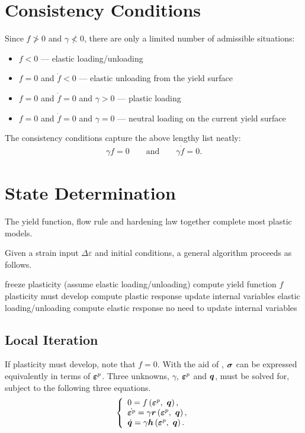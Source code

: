 \section{Consistency Conditions}
Since $f\ngtr0$ and $\gamma\nless0$, there are only a limited number of admissible situations:
\begin{itemize}
\item $f<0$ --- elastic loading/unloading
\item $f=0$ and $\dot{f}<0$ --- elastic unloading from the yield surface
\item $f=0$ and $\dot{f}=0$ and $\gamma>0$ --- plastic loading
\item $f=0$ and $\dot{f}=0$ and $\gamma=0$ --- neutral loading on the current yield surface
\end{itemize}
The consistency conditions capture the above lengthy list neatly:
\begin{gather}\label{eq:consistency_condition}
\gamma{}f=0\qquad\text{and}\qquad\gamma\dot{f}=0.
\end{gather}
\section{State Determination}
The yield function, flow rule and hardening law together complete most plastic models.

Given a strain input $\Delta\varepsilon$ and initial conditions, a general algorithm proceeds as follows.
\begin{breakablealgorithm}
\caption{general state determination algorithm of plastic models}
\begin{algorithmic}[1]
\State freeze plasticity (assume elastic loading/unloading)
\State compute yield function $f$
	\State plasticity must develop
	\State compute plastic response
	\State update internal variables
\Else
	\State elastic loading/unloading
	\State compute elastic response
	\State no need to update internal variables
\EndIf
\end{algorithmic}
\end{breakablealgorithm}
\subsection{Local Iteration}
If plasticity must develop, note that $f=0$.
With the aid of , $\bm{\sigma}$ can be expressed equivalently in terms of $\bm{\varepsilon}^p$.
Three unknowns, $\gamma$, $\bm{\varepsilon}^p$ and $\bm{q}$, must be solved for, subject to the following three equations.
\begin{gather}
\left\{
\begin{array}{l}
0=f\left(\bm{\varepsilon}^p,~\bm{q}\right),\\
\dot{\bm{\varepsilon}^p}=\gamma\bm{r}\left(\bm{\varepsilon}^p,~\bm{q}\right),\\
\dot{\bm{q}}=\gamma\bm{h}\left(\bm{\varepsilon}^p,~\bm{q}\right).
\end{array}\right.
\end{gather}

